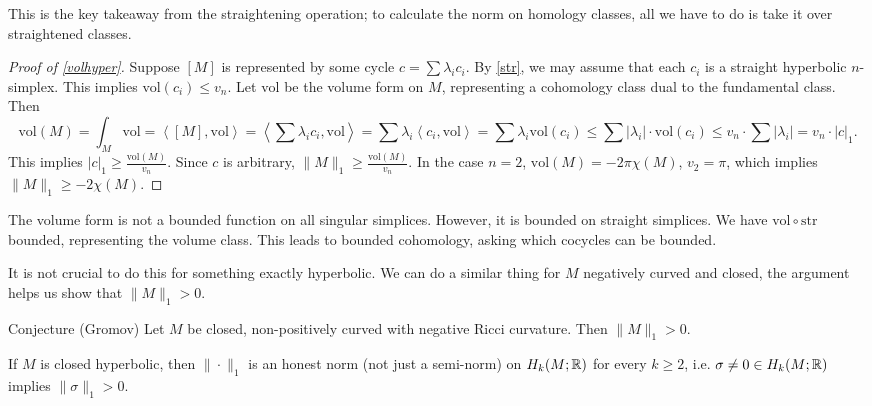 This is the key takeaway from the straightening operation; to calculate the norm on homology classes, all we have to do is take it over straightened classes.
\begin{proof}[Proof of \cref{volhyper}]
    Suppose $[M]$ is represented by some cycle $c=\sum  \lambda_i c_i $. By \cref{str}, we may assume that each $c_i $ is a straight hyperbolic $n$-simplex. This implies $\mathrm{vol}(c_i )\leq v_n $. Let $\mathrm{vol}$ be the volume form on $M$, representing a cohomology class dual to the fundamental class. Then
    \[
        \mathrm{vol}(M)=\int_M \mathrm{vol}=\left\langle [M],\mathrm{vol} \right\rangle =\left\langle \sum \lambda_i  c_i , \mathrm{vol} \right\rangle =\sum \lambda_i \left\langle c_i , \mathrm{vol} \right\rangle =\sum \lambda_i \mathrm{vol}(c_i ) \leq \sum |\lambda_i | \cdot \mathrm{vol}(c_i ) \leq v_n  \cdot \sum |\lambda_i |=v_n \cdot |c|_1. 
    \] This implies $|c|_1 \geq \frac{\mathrm{vol}(M)}{v_n }.$ Since $c$ is arbitrary, $\|M\|_1 \geq \frac{\mathrm{vol}(M)}{v_n }$. In the case $n=2$, $\mathrm{vol}(M)=-2\pi \chi(M)$, $v_2=\pi$, which implies $\|M\|_1 \geq -2\chi(M)$.
\end{proof}
\begin{remark}
    The volume form is not a bounded function on all singular simplices. However, it is bounded on straight simplices. We have $\mathrm{vol}\circ \mathrm{str}$ bounded, representing the volume class. This leads to bounded cohomology, asking which cocycles can be bounded.
\end{remark}
\begin{remark}
    It is not crucial to do this for something exactly hyperbolic. We can do a similar thing for $M$ negatively curved and closed, the argument helps us show that $\|M\|_1>0$.
\end{remark}
\begin{namedthm}{Conjecture (Gromov)} 
    Let $M$ be closed, non-positively curved with negative Ricci curvature. Then $\|M\|_1>0$.
\end{namedthm}
\begin{prop}
    If $M$ is closed hyperbolic, then $\|\cdot \|_1$ is an honest norm (not just a semi-norm) on $H_k(M;\mathbb{R})$ for every $k \geq 2$, i.e. $\sigma\neq 0 \in H_k(M;\mathbb{R})$ implies $\|\sigma\|_1>0$.
\end{prop}
